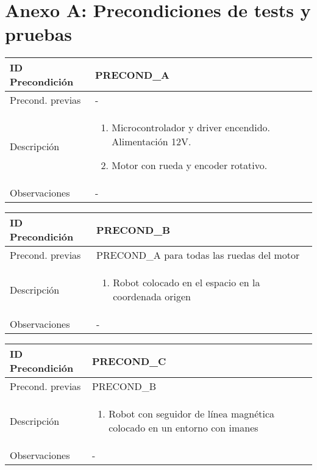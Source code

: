\section{Anexo A: Precondiciones de tests y pruebas}

\sffamily \small \begin{center} \begin{tabular} {|p{3cm}|p{9cm}|}
    \hline \rowcolor{precond_header_color}
        ID Precondición     & PRECOND\_A \\
    \hline
        Precond. previas    & - \\
    \hline
        Descripción         & \begin{enumerate}
                                \item Microcontrolador y driver encendido. Alimentación 12V.
                                \item Motor con rueda y encoder rotativo.
                            \end{enumerate} \\
    \hline
        Observaciones       & - \\
    \hline
\end{tabular} \end{center} \normalsize \normalfont


\sffamily \small \begin{center} \begin{tabular} {|p{3cm}|p{9cm}|}
    \hline \rowcolor{precond_header_color}
        ID Precondición     & PRECOND\_B \\
    \hline
        Precond. previas    & PRECOND\_A para todas las ruedas del motor \\
    \hline
        Descripción         & \begin{enumerate}
                                \item Robot colocado en el espacio en la coordenada origen
                            \end{enumerate} \\
    \hline
        Observaciones       & - \\
    \hline
\end{tabular} \end{center} \normalsize \normalfont


\sffamily \small \begin{center} \begin{tabular} {|p{3cm}|p{9cm}|}
    \hline \rowcolor{precond_header_color}
        ID Precondición     & PRECOND\_C \\
    \hline
        Precond. previas    & PRECOND\_B \\
    \hline
        Descripción         & \begin{enumerate}
                                \item Robot con seguidor de línea magnética colocado en un entorno con imanes
                            \end{enumerate} \\
    \hline
        Observaciones       & - \\
    \hline
\end{tabular} \end{center} \normalsize \normalfont


